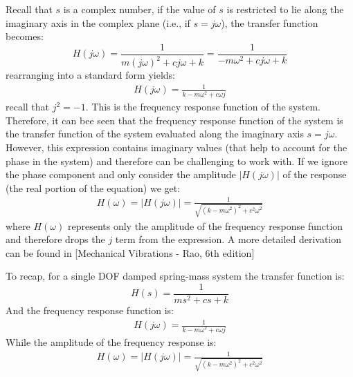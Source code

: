 \documentclass[12pt,letter]{article}
\numberwithin{ex}{section} %
\numberwithin{re}{section} %
\begin{document}
Recall that $s$ is a complex number, if the value of $s$ is restricted to lie along the imaginary axis in the complex plane (i.e., if $s = j\omega$), the transfer function becomes:
\begin{equation}
H(j\omega) = \frac{1}{m(j\omega)^2+cj\omega+k} = \frac{1}{-m\omega^2+cj\omega+k} 
\end{equation}
rearranging into a standard form yields:
\begin{eqnarray}
H(j\omega) = \frac{1}{k-m\omega^2+c\omega j}
\label{eq:frequency_response_function}
\end{eqnarray}
recall that $j^2=-1$. This is the frequency response function of the system. Therefore, it can bee seen that the frequency response function of the system is the transfer function of the system evaluated along the imaginary axis $s=j\omega$. However, this expression contains imaginary values (that help to account for the phase in the system) and therefore can be challenging to work with. If we ignore the phase component and only consider the amplitude $|H(j\omega)|$ of the response (the real portion of the equation) we get:
\begin{eqnarray}
H(\omega) = |H(j\omega)| = \frac{1}{\sqrt{(k-m\omega^2)^2+c^2\omega^2}}
\end{eqnarray}
where $H(\omega)$ represents only the amplitude of the frequency response function and therefore drops the $j$ term from the expression. A more detailed derivation can be found in [Mechanical Vibrations - Rao, 6th edition]



To recap, for a single DOF damped spring-mass system the transfer function is:
\begin{equation}
H(s) = \frac{1}{ms^2+cs+k}
\end{equation}
And the frequency response function is:
\begin{eqnarray}
H(j\omega) = \frac{1}{k-m\omega^2+c\omega j}
\end{eqnarray}
While the amplitude of the frequency response is:
\begin{eqnarray}
H(\omega) = |H(j\omega)| = \frac{1}{\sqrt{(k-m\omega^2)^2+c^2\omega^2}}
\end{eqnarray}
\end{document}

